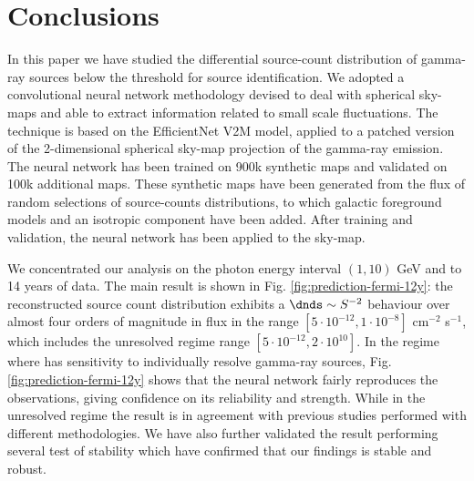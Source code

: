 \section{Conclusions}


In this paper we have studied the differential source-count distribution of gamma-ray sources below the \fermi  threshold for source identification. We  adopted a convolutional neural network methodology devised to deal with spherical sky-maps and able to extract information related to small scale fluctuations. The technique is based on the EfficientNet V2M model, applied to a patched version of the 2-dimensional spherical sky-map projection of the gamma-ray emission. The neural network has been trained on 900k synthetic maps and validated on 100k additional maps. These synthetic maps have been generated from the flux of random selections of source-counts distributions, to which galactic foreground models and an isotropic component have been added. After training and validation, the neural network has been applied to the \fermi sky-map.

We concentrated our analysis on the photon energy interval $(1,10)$ GeV and to 14 years of data. The main result is shown in Fig. \ref{fig:prediction-fermi-12y}: the reconstructed source count distribution exhibits a $\dnds \sim S^{-2}$ behaviour over almost four orders of magnitude in flux in the range  
$[5 \cdot 10^{-12} , 1 \cdot 10^{-8}]$ cm$^{-2}$ s$^{-1}$, which includes the unresolved regime range 
$[5 \cdot 10^{-12}, 2 \cdot 10^{10}]$.
In the regime where \fermi has sensitivity to individually resolve gamma-ray sources, Fig. \ref{fig:prediction-fermi-12y} shows that the neural network fairly reproduces the observations, giving confidence on its reliability and strength.
While in the unresolved regime the result is in agreement with previous studies performed with different methodologies.
We have also further validated the result performing several test of stability which have confirmed that  our findings is stable and robust.

